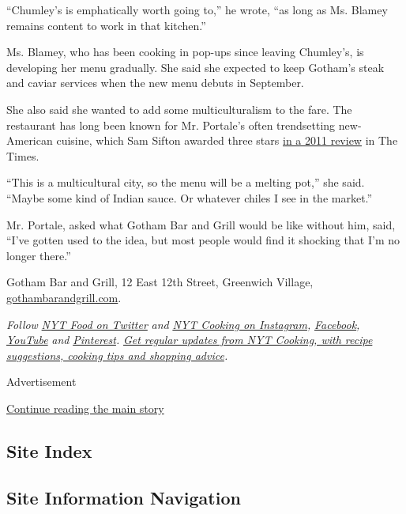 ``Chumley's is emphatically worth going to,'' he wrote, ``as long as Ms.
Blamey remains content to work in that kitchen.''

Ms. Blamey, who has been cooking in pop-ups since leaving Chumley's, is
developing her menu gradually. She said she expected to keep Gotham's
steak and caviar services when the new menu debuts in September.

She also said she wanted to add some multiculturalism to the fare. The
restaurant has long been known for Mr. Portale's often trendsetting
new-American cuisine, which Sam Sifton awarded three stars
\href{https://www.nytimes3xbfgragh.onion/2011/05/18/dining/reviews/gotham-bar-and-grill-nyc-restaurant-review.html}{in
a 2011 review} in The Times.

``This is a multicultural city, so the menu will be a melting pot,'' she
said. ``Maybe some kind of Indian sauce. Or whatever chiles I see in the
market.''

Mr. Portale, asked what Gotham Bar and Grill would be like without him,
said, ``I've gotten used to the idea, but most people would find it
shocking that I'm no longer there.''

Gotham Bar and Grill, 12 East 12th Street, Greenwich Village,
\href{https://www.gothambarandgrill.com/}{gothambarandgrill.com}.

\emph{Follow} \href{https://twitter.com/nytfood}{\emph{NYT Food on
Twitter}} \emph{and}
\href{https://www.instagram.com/nytcooking/}{\emph{NYT Cooking on
Instagram}}\emph{,}
\href{https://www.facebookcorewwwi.onion/nytcooking/}{\emph{Facebook}}\emph{,}
\href{https://www.youtube.com/nytcooking}{\emph{YouTube}} \emph{and}
\href{https://www.pinterest.com/nytcooking/}{\emph{Pinterest}}\emph{.}
\href{https://www.nytimes3xbfgragh.onion/newsletters/cooking}{\emph{Get
regular updates from NYT Cooking, with recipe suggestions, cooking tips
and shopping advice}}\emph{.}

Advertisement

\protect\hyperlink{after-bottom}{Continue reading the main story}

\hypertarget{site-index}{%
\subsection{Site Index}\label{site-index}}

\hypertarget{site-information-navigation}{%
\subsection{Site Information
Navigation}\label{site-information-navigation}}

